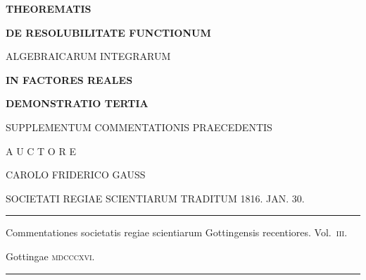 \clearpage
{}
\thispagestyle{empty}
\begin{center}
\vspace*{.25in}
{\large\bfseries THEOREMATIS}\par
\vspace{.35in}
{\Large\bfseries DE RESOLUBILITATE FUNCTIONUM\par
\medskip ALGEBRAICARUM INTEGRARUM}\par
\vspace{.35in}
{\bfseries IN FACTORES REALES}\par
\vspace{.35in}
{\large\bfseries DEMONSTRATIO TERTIA}\par
\vspace{.5in}
SUPPLEMENTUM COMMENTATIONIS PRAECEDENTIS\par
\vspace{.5in}
A U C T O R E\par
\vspace{.3in}
{\large CAROLO FRIDERICO GAUSS}\par
\vspace{.4in}
SOCIETATI REGIAE SCIENTIARUM TRADITUM 1816. JAN. 30.\par
\vspace{.65in}
\rule{.88\linewidth}{.3pt}\par
\medskip
{\small Commentationes societatis regiae scientiarum Gottingensis recentiores. Vol.~\textsc{iii}.\par}
\medskip
Gottingae \textsc{mdcccxvi}.\par
\medskip
\rule{.88\linewidth}{.3pt}
\end{center}
\clearpage
